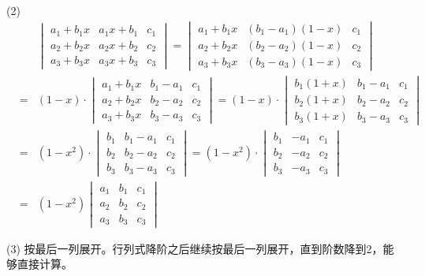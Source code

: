 \documentclass[a4paper]{book}
\begin{document}
\item[(2)]
\begin{eqnarray*}
& & \begin{vmatrix} a_1 + b_1x & a_1x + b_1 & c_1 \\ a_2 + b_2x & a_2x + b_2 & c_2 \\ a_3 + b_3x & a_3x + b_3 & c_3 \end{vmatrix} = \begin{vmatrix} a_1 + b_1x & (b_1 - a_1)(1 - x) & c_1 \\ a_2 + b_2x & (b_2 - a_2)(1 - x) & c_2 \\ a_3 + b_3x & (b_3 - a_3)(1 - x) & c_3 \end{vmatrix} \\
& = & (1 - x)\cdot\begin{vmatrix} a_1 + b_1x & b_1 - a_1 & c_1 \\ a_2 + b_2x & b_2 - a_2 & c_2 \\ a_3 + b_3x & b_3 - a_3 & c_3 \end{vmatrix} = (1 - x)\cdot\begin{vmatrix} b_1(1+x) & b_1 - a_1 & c_1 \\ b_2(1+x) & b_2 - a_2 & c_2 \\ b_3(1+x) & b_3 - a_3 & c_3 \end{vmatrix} \\
& = & (1 - x^2)\cdot\begin{vmatrix} b_1 & b_1 - a_1 & c_1 \\ b_2 & b_2 - a_2 & c_2 \\ b_3 & b_3 - a_3 & c_3 \end{vmatrix} = (1 - x^2)\cdot\begin{vmatrix} b_1 & -a_1 & c_1 \\ b_2 & -a_2 & c_2 \\ b_3 & -a_3 & c_3 \end{vmatrix}\\
& = & (1 - x^2)\begin{vmatrix} a_1 & b_1 & c_1 \\ a_2 & b_2 & c_2 \\ a_3 & b_3 & c_3 \end{vmatrix}
\end{eqnarray*}

\item[(3)] 按最后一列展开。行列式降阶之后继续按最后一列展开，直到阶数降到2，能够直接计算。
\end{document}
